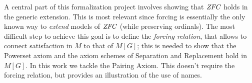 A central part of this formalization project involves showing that
$\mathit{ZFC}$ holds in the generic extension. This is most relevant since
forcing is essentially the only known way to \emph{extend} models of
$\mathit{ZFC}$ (while preserving ordinals). The most difficult step to achieve
this goal is to define the \emph{forcing relation}, that allows to
connect satisfaction in $M$ to that of $M[G]$; this is needed to show
that the Powerset axiom and the axiom schemes of Separation and
Replacement hold in $M[G]$. In this work we tackle the Pairing
Axiom. This doesn't require the forcing relation, but provides an
illustration of the use of names.
   

